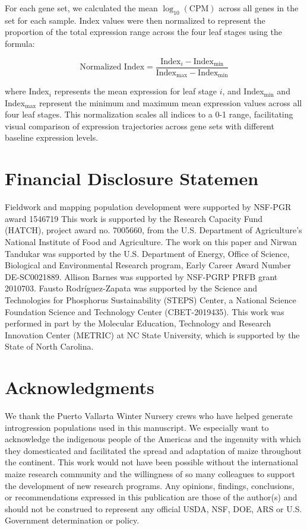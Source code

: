 \documentclass[9pt,twocolumn,twoside]{rilabRxiv}
\begin{document}
For each gene set, we calculated the mean $\log_{10}(\text{CPM})$ across all genes in the set for each sample. 
Index values were then normalized to represent the proportion of the total expression range across the four leaf stages using the formula:

$$\text{Normalized Index} = \frac{\text{Index}_i - \text{Index}_{\min}}{\text{Index}_{\max} - \text{Index}_{\min}}$$

where Index$_i$ represents the mean expression for leaf stage $i$, and Index$_{\min}$ and Index$_{\max}$ represent the minimum and maximum mean expression values across all four leaf stages. This normalization scales all indices to a 0-1 range, facilitating visual comparison of expression trajectories across gene sets with different baseline expression levels.


\section{Financial Disclosure Statemen}

Fieldwork and mapping population development were supported by NSF-PGR award 1546719
This work is supported by the Research Capacity Fund (HATCH), project award no. 7005660, from the U.S. Department of Agriculture’s National Institute of Food and Agriculture.  
The work on this paper and Nirwan Tandukar was supported by the U.S. Department of Energy, Office of Science, Biological and Environmental Research program, Early Career Award Number DE-SC0021889.
Allison Barnes was supported by NSF-PGRP PRFB grant 2010703. 
Fausto Rodríguez-Zapata was supported by the Science and Technologies for Phosphorus Sustainability (STEPS) Center, a National Science Foundation Science and Technology Center (CBET-2019435).
This work was performed in part by the Molecular Education, Technology and Research Innovation Center (METRIC) at NC State University, which is supported by the State of North Carolina. 

\section{Acknowledgments}
We thank the  Puerto Vallarta Winter Nursery crews who have helped generate introgression populations used in this manuscript.
We especially want to acknowledge the indigenous people of the Americas and the ingenuity with which they domesticated and facilitated the spread and adaptation of maize throughout the continent.
This work would not have been possible without the international maize research community and the willingness of so many colleagues to support the development of new research programs.
Any opinions, findings, conclusions, or recommendations expressed in this publication are those of the author(s) and should not be construed to represent any official USDA, NSF, DOE, ARS or U.S. Government determination or policy.
\end{document}
